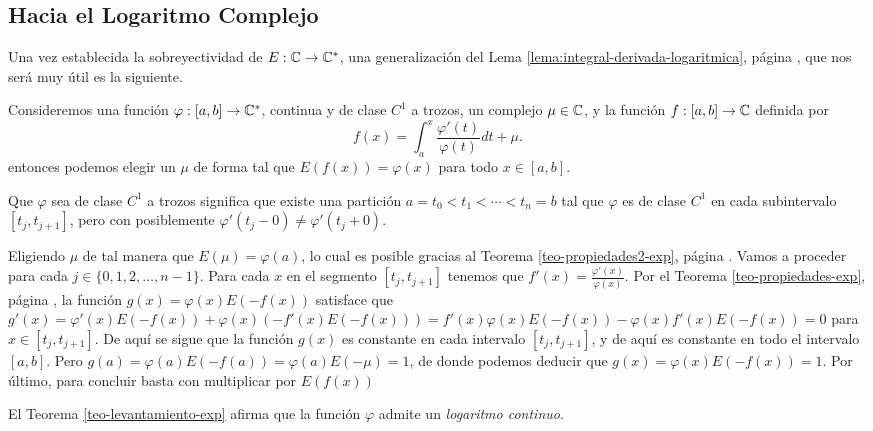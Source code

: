\subsection{Hacia el Logaritmo Complejo}
Una vez establecida la sobreyectividad de \(E:\mathbb{C} \rightarrow \mathbb{C}^* \), una generalización del Lema \ref{lema:integral-derivada-logaritmica}, página 
\pageref{lema:integral-derivada-logaritmica}, que nos será muy útil es la siguiente.

\begin{theo}[Levantamiento]\label{teo-levantamiento-exp}
    Consideremos una función \(\varphi : [a, b]\rightarrow \mathbb{C}^* \), continua y de clase \(C^1\) a trozos, un complejo \(\mu \in \mathbb{C} \), y la función
    \(f: [a, b] \rightarrow \mathbb{C} \) definida por 
    \[
    \displaystyle f(x) = \int_{a}^{x} \frac{\varphi'(t)}{\varphi(t)} dt + \mu.
    \]
    entonces podemos elegir un \(\mu \) de forma tal que \(E(f(x)) = \varphi(x)\) para todo \(x\in [a,b]\).
\end{theo}
\begin{dem}
    Que \(\varphi\) sea de clase \(C^1\) a trozos significa que existe una partición \(a=t_0 < t_1 < \cdots < t_n = b\) tal que
    \(\varphi\) es de clase \(C^1\) en cada subintervalo \([t_j, t_{j+1}]\), pero con posiblemente \(\varphi'(t_j - 0) \neq \varphi'(t_j + 0)\).

    Eligiendo \(\mu\) de tal manera que \(E(\mu) = \varphi(a)\), lo cual es posible gracias al Teorema \ref{teo-propiedades2-exp}, página \pageref{teo-propiedades2-exp}. 
    Vamos a proceder para cada \(j \in \{0,1,2, \dots , n-1 \}\). Para cada \(x\) en el segmento \([t_j, t_{j+1}]\) tenemos que \(f'(x)= \frac{\varphi'(x)}{\varphi(x)}\).
    Por el Teorema \ref{teo-propiedades-exp}, página \pageref{teo-propiedades-exp}, la función \(g(x) = \varphi(x)E(-f(x))\) satisface que 
    \(g'(x)= \varphi'(x)E(-f(x)) + \varphi(x)(-f'(x)E(-f(x))) = f'(x)\varphi(x)E(-f(x)) - \varphi(x)f'(x)E(-f(x)) = 0 \) para \(x \in [t_j, t_{j+1}]\). De aquí se sigue 
    que la función \(g(x)\) es constante en cada intervalo \([t_j, t_{j+1}]\), y de aquí es constante en todo el intervalo \([a, b]\). Pero 
    \(g(a) = \varphi(a)E(-f(a)) = \varphi(a)E(-\mu) = 1\), de donde podemos deducir que \(g(x) = \varphi(x)E(-f(x)) = 1\). Por último, para concluir basta con multiplicar 
    por \(E(f(x))\)
\end{dem}

\begin{obs}
    El Teorema \ref{teo-levantamiento-exp} afirma que la función \(\varphi\) admite un {\it logaritmo continuo}. 
\end{obs}